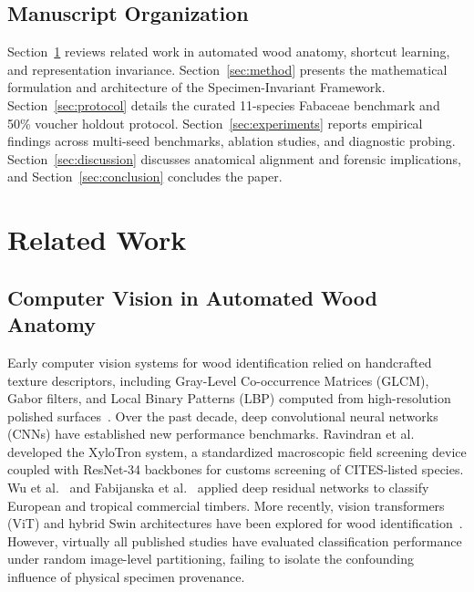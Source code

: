 \documentclass[a4paper,fleqn]{cas-sc}
\begin{document}
\subsection{Manuscript Organization}
Section~\ref{sec:related} reviews related work in automated wood anatomy, shortcut learning, and representation invariance. Section~\ref{sec:method} presents the mathematical formulation and architecture of the Specimen-Invariant Framework. Section~\ref{sec:protocol} details the curated 11-species Fabaceae benchmark and 50\% voucher holdout protocol. Section~\ref{sec:experiments} reports empirical findings across multi-seed benchmarks, ablation studies, and diagnostic probing. Section~\ref{sec:discussion} discusses anatomical alignment and forensic implications, and Section~\ref{sec:conclusion} concludes the paper.

\section{Related Work}
\label{sec:related}

\subsection{Computer Vision in Automated Wood Anatomy}
Early computer vision systems for wood identification relied on handcrafted texture descriptors, including Gray-Level Co-occurrence Matrices (GLCM), Gabor filters, and Local Binary Patterns (LBP) computed from high-resolution polished surfaces~\cite{wiedenhoeft2011,ravindran2019}. Over the past decade, deep convolutional neural networks (CNNs) have established new performance benchmarks. Ravindran et al.~\cite{ravindran2020,ravindran2021,ravindran2022} developed the XyloTron system, a standardized macroscopic field screening device coupled with ResNet-34 backbones for customs screening of CITES-listed species. Wu et al.~\cite{wu2021} and Fabijanska et al.~\cite{fabijanska2021} applied deep residual networks to classify European and tropical commercial timbers. More recently, vision transformers (ViT) and hybrid Swin architectures have been explored for wood identification~\cite{song2025,liu2025}. However, virtually all published studies have evaluated classification performance under random image-level partitioning, failing to isolate the confounding influence of physical specimen provenance.
\end{document}

